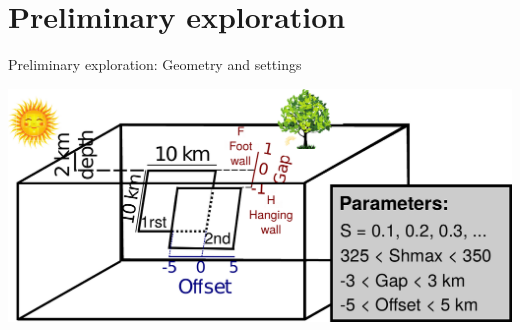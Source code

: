 \documentclass{beamer}
\begin{document}
\section{Preliminary exploration}

\begin{frame}
 {Preliminary exploration: Geometry and settings}
 
  \includegraphics[width=1\linewidth]{images/schematic_view_param_new}
 
 \hfill {\tiny \citep[www.seissol.org; e.g.,][]{Wollherr_2018_OFP, Ulrich_2019_CPB}}
 
\end{frame}
\end{document}
